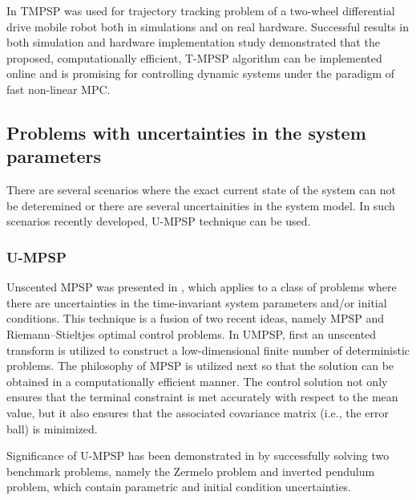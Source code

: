 \documentclass[12pt]{article}
\let\oldref\ref
\renewcommand{\ref}[1]{(\oldref{#1})}
\renewcommand{\vec}[1]{\mathbf{#1}}
\begin{document}
In \cite{kumar2019model} TMPSP was used for trajectory tracking problem of a two-wheel differential drive mobile robot both in simulations and on real hardware. Successful results in both simulation and hardware implementation study demonstrated that the proposed, computationally efficient, T-MPSP algorithm can be implemented online and is promising for controlling dynamic systems under the paradigm of fast non-linear MPC.

\subsection{Problems with uncertainties in the system parameters}

There are several scenarios where the exact current state of the system can not be deteremined or there are several uncertainities in the system model. In such scenarios recently developed, U-MPSP technique can be used. 

\subsubsection*{U-MPSP}
Unscented MPSP was presented in \cite{mathavaraj2019unscented}, which applies to a class of problems where there are uncertainties in the time-invariant system parameters and/or initial conditions. This technique is a fusion of two recent ideas, namely MPSP and Riemann–Stieltjes optimal control problems. In UMPSP, first an unscented transform is utilized to construct a low-dimensional finite number of deterministic problems. The philosophy of MPSP is utilized next so that the solution can be obtained in a computationally efficient manner. The control solution not only ensures that the terminal constraint is met accurately with respect to the mean value, but it also ensures that the associated covariance matrix (i.e., the error ball) is minimized.

Significance of U-MPSP has been demonstrated in \cite{mathavaraj2019unscented} by successfully solving two benchmark problems, namely the Zermelo problem and inverted pendulum problem, which contain parametric and initial condition uncertainties.



\end{document}
